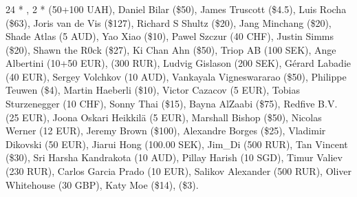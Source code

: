 \subsubsection*{}

24 * , 
2 *  (50+100 UAH), 
Daniel Bilar (\$50), 
James Truscott (\$4.5),
Luis Rocha (\$63), 
Joris van de Vis (\$127), 
Richard S Shultz (\$20), 
Jang Minchang (\$20), 
Shade Atlas (5 AUD), 
Yao Xiao (\$10),
Pawel Szczur (40 CHF), 
Justin Simms (\$20), 
Shawn the R0ck (\$27), 
Ki Chan Ahn (\$50), 
Triop AB (100 SEK), 
Ange Albertini (10+50 EUR),
 (300 RUR), 
Ludvig Gislason (200 SEK), 
Gérard Labadie (40 EUR), 
Sergey Volchkov (10 AUD),
Vankayala Vigneswararao (\$50),
Philippe Teuwen (\$4),
Martin Haeberli (\$10),
Victor Cazacov (5 EUR),
Tobias Sturzenegger (10 CHF),
Sonny Thai (\$15),
Bayna AlZaabi (\$75),
Redfive B.V. (25 EUR),
Joona Oskari Heikkilä (5 EUR),
Marshall Bishop (\$50),
Nicolas Werner (12 EUR),
Jeremy Brown (\$100),
Alexandre Borges (\$25),
Vladimir Dikovski (50 EUR),
Jiarui Hong (100.00 SEK),
Jim\_Di (500 RUR),
Tan Vincent (\$30),
Sri Harsha Kandrakota (10 AUD),
Pillay Harish (10 SGD),
Timur Valiev (230 RUR),
Carlos Garcia Prado (10 EUR),
Salikov Alexander (500 RUR),
Oliver Whitehouse (30 GBP),
Katy Moe (\$14),
 (\$3).
